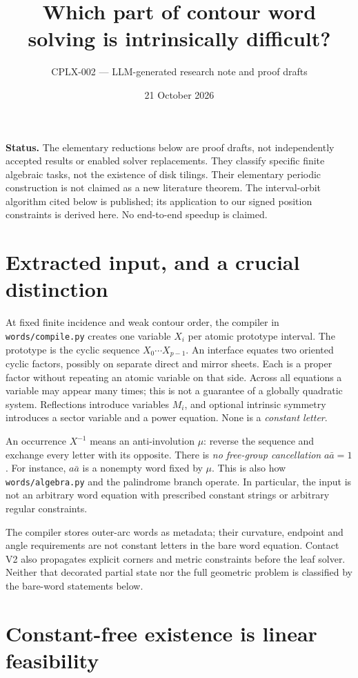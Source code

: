 \documentclass[11pt]{article}
\title{Which part of contour word solving is intrinsically difficult?}
\author{CPLX-002 --- LLM-generated research note and proof drafts}
\date{21 October 2026}
\begin{document}
\maketitle

\noindent\textbf{Status.} The elementary reductions below are proof drafts,
not independently accepted results or enabled solver replacements. They classify
specific finite algebraic tasks, not the existence of disk tilings. Their
elementary periodic construction is not claimed as a new literature theorem.
The interval-orbit algorithm cited below is published; its application to our
signed position constraints is derived here. No end-to-end speedup is claimed.

\section{Extracted input, and a crucial distinction}

At fixed finite incidence and weak contour order, the compiler in
\texttt{words/compile.py} creates one variable $X_i$ per atomic prototype
interval. The prototype is the cyclic sequence $X_0\cdots X_{p-1}$.
An interface equates two oriented cyclic factors, possibly on separate direct
and mirror sheets. Each is a proper factor without repeating an atomic
variable on that side. Across all equations a variable may appear many times;
this is not a guarantee of a globally quadratic system. Reflections introduce
variables $M_i$, and optional intrinsic symmetry introduces a sector variable
and a power equation. None is a \emph{constant letter}.

An occurrence $X^{-1}$ means an anti-involution $\mu$: reverse the sequence
and exchange every letter with its opposite. There is \emph{no free-group
cancellation} $a\bar a=1$. For instance, $a\bar a$ is a nonempty word fixed
by $\mu$. This is also how \texttt{words/algebra.py} and the palindrome branch
operate. In particular, the input is not an arbitrary word equation with
prescribed constant strings or arbitrary regular constraints.

The compiler stores outer-arc words as metadata; their curvature, endpoint and
angle requirements are not constant letters in the bare word equation.
Contact V2 also propagates explicit corners and metric constraints before the
leaf solver. Neither that decorated partial state nor the full geometric
problem is classified by the bare-word statements below.

\section{Constant-free existence is linear feasibility}
\end{document}
